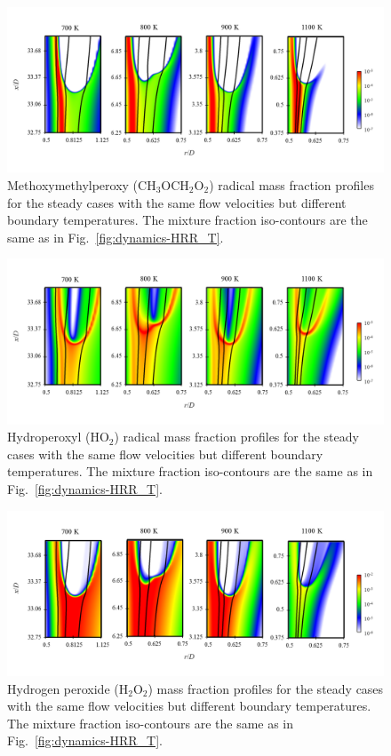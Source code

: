 \begin{figure}[t]
  \centering
  \scriptsize
  \includegraphics[width=1.0\textwidth]{ch-dynamics/RO2_T.png}
  \normalsize
  \caption{Methoxymethylperoxy (CH$_3$OCH$_2$O$_2$) radical mass fraction profiles for the steady cases with the same flow velocities but different boundary temperatures.  The mixture fraction iso-contours are the same as in Fig.~\ref{fig:dynamics-HRR_T}.}
  \label{fig:RO2_T}
\end{figure}

\begin{figure}[t]
  \centering
  \scriptsize
  \includegraphics[width=1.0\textwidth]{ch-dynamics/HO2_T.png}
  \normalsize
  \caption{Hydroperoxyl (HO$_2$) radical mass fraction profiles for the steady cases with the same flow velocities but different boundary temperatures.  The mixture fraction iso-contours are the same as in Fig.~\ref{fig:dynamics-HRR_T}.}
  \label{fig:HO2_T}
\end{figure}

\begin{figure}[t]
  \centering
  \scriptsize
  \includegraphics[width=1.0\textwidth]{ch-dynamics/H2O2_T.png}
  \normalsize
  \caption{Hydrogen peroxide (H$_2$O$_2$) mass fraction profiles for the steady cases with the same flow velocities but different boundary temperatures.  The mixture fraction iso-contours are the same as in Fig.~\ref{fig:dynamics-HRR_T}.}
  \label{fig:H2O2_T}
\end{figure}

